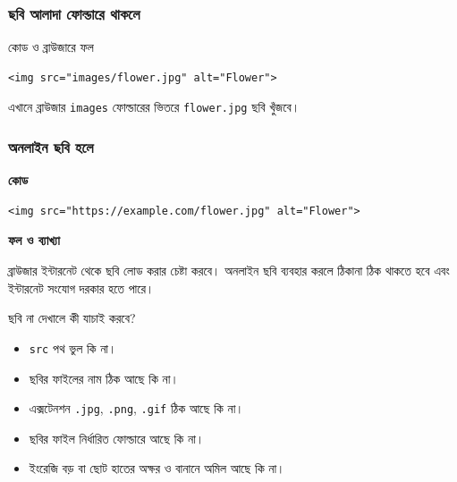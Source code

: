 \subsubsection{ছবি আলাদা ফোল্ডারে থাকলে}

\begin{chFourWholeExample}{কোড ও ব্রাউজারে ফল}
\noindent
\begin{minipage}[t]{.50\linewidth}\vspace{0pt}

\begin{verbatim}
<img src="images/flower.jpg" alt="Flower">
\end{verbatim}

\end{minipage}\hfill
\begin{minipage}[t]{.46\linewidth}\vspace{0pt}
এখানে ব্রাউজার \texttt{images} ফোল্ডারের ভিতরে \texttt{flower.jpg} ছবি খুঁজবে।
\end{minipage}

\end{chFourWholeExample}

\subsubsection{অনলাইন ছবি হলে}

\par\noindent
\begin{minipage}[t]{.54\linewidth}\vspace{0pt}\small
\textbf{\color{chFourTeal}কোড}\par
\begin{verbatim}
<img src="https://example.com/flower.jpg" alt="Flower">
\end{verbatim}

\par\smallskip
\end{minipage}\hfill
\begin{minipage}[t]{.42\linewidth}\vspace{0pt}\small
\textbf{\color{chFourTeal}ফল ও ব্যাখ্যা}\par
ব্রাউজার ইন্টারনেট থেকে ছবি লোড করার চেষ্টা করবে। অনলাইন ছবি ব্যবহার করলে ঠিকানা ঠিক থাকতে হবে এবং ইন্টারনেট সংযোগ দরকার হতে পারে।
\par\smallskip
\end{minipage}\par


\begin{mistakebox}{ছবি না দেখালে কী যাচাই করবে?}
\begin{itemize}
\item \texttt{src} পথ ভুল কি না।
\item ছবির ফাইলের নাম ঠিক আছে কি না।
\item এক্সটেনশন \texttt{.jpg}, \texttt{.png}, \texttt{.gif} ঠিক আছে কি না।
\item ছবির ফাইল নির্ধারিত ফোল্ডারে আছে কি না।
\item ইংরেজি বড় বা ছোট হাতের অক্ষর ও বানানে অমিল আছে কি না।
\end{itemize}
\end{mistakebox}

